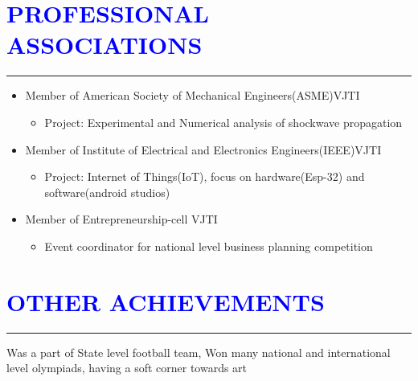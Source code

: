 \documentclass{article}
\begin{document}
\vspace{3pt}
\section*{\large{\textcolor{blue}{\uppercase{Professional Associations}}}}
\hrule
\vspace{3pt}

\begin{itemize}[noitemsep,nolistsep]
	\item Member of American Society of Mechanical Engineers(ASME)VJTI
	\begin{itemize}[noitemsep,nolistsep]
		\item Project: Experimental and Numerical analysis of shockwave propagation
	\end{itemize}
	\item Member of Institute of Electrical and Electronics Engineers(IEEE)VJTI
	\begin{itemize}[noitemsep,nolistsep]
		\item Project: Internet of Things(IoT), focus on hardware(Esp-32) and software(android studios)
	\end{itemize}
	\item Member of Entrepreneurship-cell VJTI
	\begin{itemize}[noitemsep,nolistsep]
		\item Event coordinator for national level business planning competition
	\end{itemize}
\end{itemize}

\section*{\large{\textcolor{blue}{\uppercase{Other achievements}}}}
\hrule
\vspace{3pt}
	Was a part of State level football team, Won many national and international level olympiads, having a soft corner towards art

\vspace{3pt}
\end{document}
